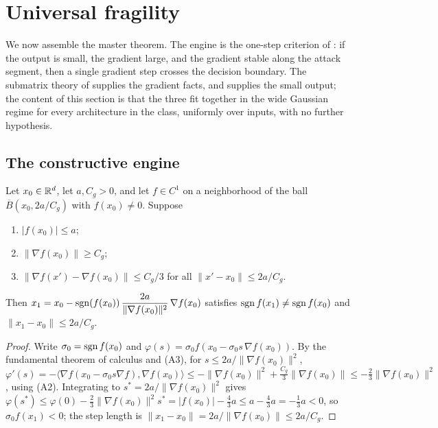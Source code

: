 \section{Universal fragility}\label{sec:fragility}

We now assemble the master theorem. The engine is the one-step criterion of \cite{advExt}: if the
output is small, the gradient large, and the gradient stable along the attack segment, then a single
gradient step crosses the decision boundary. The submatrix theory of  supplies the
gradient facts, and  supplies the small output; the content of this section is that
the three fit together in the wide Gaussian regime for every architecture in the class, uniformly over
inputs, with no further hypothesis.

\subsection{The constructive engine}
\begin{proposition}\label{prop:engine}
Let $x_0\in\mathbb{R}^d$, let $a,C_g>0$, and let $f\in C^1$ on a neighborhood of the ball
$\overline B(x_0,2a/C_g)$ with $f(x_0)\ne0$. Suppose
\begin{enumerate}
\item[(A1)] $|f(x_0)|\le a$;\qquad
\item[(A2)] $\|\nabla f(x_0)\|\ge C_g$;\qquad
\item[(A3)] $\|\nabla f(x')-\nabla f(x_0)\|\le C_g/3$ for all $\|x'-x_0\|\le 2a/C_g$.
\end{enumerate}
Then $x_1=x_0-\operatorname{sgn}(f(x_0))\,\dfrac{2a}{\|\nabla f(x_0)\|^2}\,\nabla f(x_0)$ satisfies
$\operatorname{sgn} f(x_1)\ne\operatorname{sgn} f(x_0)$ and $\|x_1-x_0\|\le 2a/C_g$.
\end{proposition}

\begin{proof}
Write $\sigma_0=\operatorname{sgn} f(x_0)$ and $\varphi(s)=\sigma_0 f(x_0-\sigma_0 s\,\nabla f(x_0))$. By the
fundamental theorem of calculus and (A3), for $s\le 2a/\|\nabla f(x_0)\|^2$,
$\varphi'(s)=-\langle\nabla f(x_0-\sigma_0 s\nabla f),\nabla f(x_0)\rangle\le-\|\nabla f(x_0)\|^2+\tfrac{C_g}{3}\|\nabla f(x_0)\|\le-\tfrac23\|\nabla f(x_0)\|^2$,
using (A2). Integrating to $s^*=2a/\|\nabla f(x_0)\|^2$ gives
$\varphi(s^*)\le\varphi(0)-\tfrac23\|\nabla f(x_0)\|^2 s^*=|f(x_0)|-\tfrac43 a\le a-\tfrac43a=-\tfrac13a<0$,
so $\sigma_0 f(x_1)<0$; the step length is $\|x_1-x_0\|=2a/\|\nabla f(x_0)\|\le 2a/C_g$.
\end{proof}

